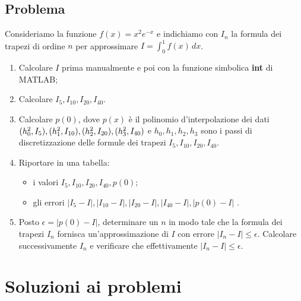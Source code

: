 \documentclass[a4paper,12pt]{article}
\begin{document}
\subsection{Problema}
Consideriamo la funzione $f(x) = x^2e^{-x}$ e indichiamo con $I_n$ la formula dei trapezi di ordine
$n$ per approssimare $I=\int_{0}^{1} f(x) \,dx $.
\begin{enumerate}[label=(\alph*)]
\item Calcolare $I$ prima manualmente e poi con la funzione simbolica \textbf{int} di MATLAB;
\item Calcolare $I_5, I_{10}, I_{20}, I_{40}$.
\item Calcolare $p(0)$, dove $p(x)$ è il polinomio d’interpolazione dei dati $(h^2_0, I_5),\\(h^2_1, I_{10}),(h^2_2, I_{20}),(h^2_3, I_{40}) $ e
$h_0, h_1, h_2, h_3$ sono i passi di discretizzazione delle formule dei trapezi $I_5, I_{10}, I_{20}, I_{40}$.
\item Riportare in una tabella:
\begin{itemize}
\item i valori $I_5, I_{10}, I_{20}, I_{40}, p(0)$;
\item gli errori $|I_{5}-I|,|I_{10}-I|,|I_{20}-I|,|I_{40}-I|,|p(0)-I|$ .
\end{itemize}
\item Posto $\epsilon=|p(0)-I|$, determinare un $n$ in modo tale che la formula dei trapezi $I_n$ fornisca un’approssimazione
di $I$ con errore $|I_n-I|\leq\epsilon$. Calcolare successivamente $I_n$ e verificare che effettivamente $|I_n-I|\leq\epsilon$.
\end{enumerate}


\section{Soluzioni ai problemi}
\end{document}
